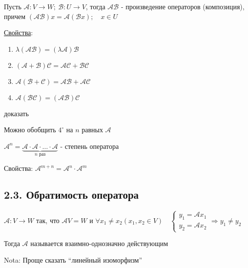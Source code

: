 \documentclass[12pt]{article}
\begin{document}
    \Def Пусть $\mathcal{A} : V \rightarrow W; \ \mathcal{B} : U \rightarrow V$, тогда 
    $\mathcal{A}\mathcal{B}$ - произведение операторов (композиция), причем
    $(\mathcal{A}\mathcal{B}) x = \mathcal{A}(\mathcal{B}x); \quad x \in U$

    \hypertarget{linearoperatorproperties}{}

    \underline{Свойства}: 

    \begin{enumerate}[label*=\arabic*$^\circ$]
        \item $\lambda (\mathcal{A}\mathcal{B}) = (\lambda \mathcal{A})\mathcal{B}$

        \item $(\mathcal{A} + \mathcal{B}) \mathcal{C} = \mathcal{A}\mathcal{C} + \mathcal{B}\mathcal{C}$

        \item $\mathcal{A} (\mathcal{B} + \mathcal{C}) = \mathcal{A}\mathcal{B} + \mathcal{A}\mathcal{C}$

        \item $\mathcal{A} (\mathcal{B}\mathcal{C}) = (\mathcal{A}\mathcal{B}) \mathcal{C}$
    \end{enumerate}

    \Lab доказать

    \Nota Можно обобщить $4^\circ$ на $n$ равных $\mathcal{A}$

    \Defs $\mathcal{A}^n = \underset{n \text{ раз}}{\underbrace{\mathcal{A} \cdot \mathcal{A} \cdot \dots \cdot \mathcal{A}}}$ - степень оператора

    Свойства: $\mathcal{A}^{m + n} = \mathcal{A}^n \cdot \mathcal{A}^m$

    \subsection[p2\_3]{2.3. Обратимость оператора}

    \hypertarget{onetoonelinearoperator}{}

    \Def $\mathcal{A} : V \rightarrow W$ так, что $\mathcal{A}V = W$ и $\forall x_1 \neq x_2 (x_1, x_2 \in V) \quad
    \begin{cases}y_1 = \mathcal{A}x_1 \\ y_2 = \mathcal{A}x_2\end{cases} \Longrightarrow y_1 \neq y_2$

    Тогда $\mathcal{A}$ называется взаимно-однозначно действующим

    Nota: Проще сказать \enquote{линейный изоморфизм}
\end{document}
